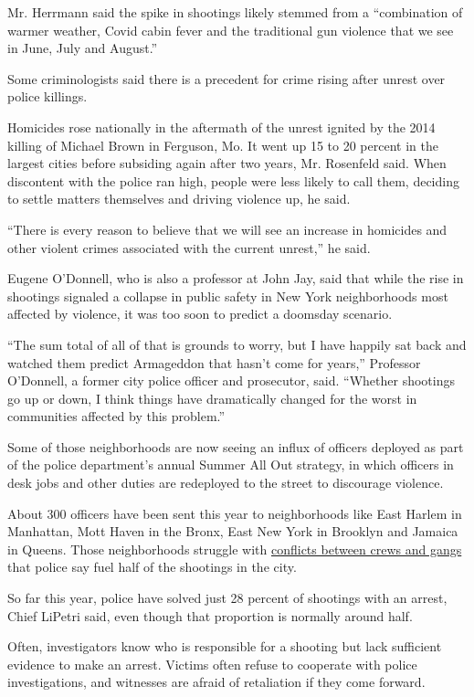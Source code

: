 Mr. Herrmann said the spike in shootings likely stemmed from a
``combination of warmer weather, Covid cabin fever and the traditional
gun violence that we see in June, July and August.''

Some criminologists said there is a precedent for crime rising after
unrest over police killings.

Homicides rose nationally in the aftermath of the unrest ignited by the
2014 killing of Michael Brown in Ferguson, Mo. It went up 15 to 20
percent in the largest cities before subsiding again after two years,
Mr. Rosenfeld said. When discontent with the police ran high, people
were less likely to call them, deciding to settle matters themselves and
driving violence up, he said.

``There is every reason to believe that we will see an increase in
homicides and other violent crimes associated with the current unrest,''
he said.

Eugene O'Donnell, who is also a professor at John Jay, said that while
the rise in shootings signaled a collapse in public safety in New York
neighborhoods most affected by violence, it was too soon to predict a
doomsday scenario.

``The sum total of all of that is grounds to worry, but I have happily
sat back and watched them predict Armageddon that hasn't come for
years,'' Professor O'Donnell, a former city police officer and
prosecutor, said. ``Whether shootings go up or down, I think things have
dramatically changed for the worst in communities affected by this
problem.''

Some of those neighborhoods are now seeing an influx of officers
deployed as part of the police department's annual Summer All Out
strategy, in which officers in desk jobs and other duties are redeployed
to the street to discourage violence.

About 300 officers have been sent this year to neighborhoods like East
Harlem in Manhattan, Mott Haven in the Bronx, East New York in Brooklyn
and Jamaica in Queens. Those neighborhoods struggle with
\href{https://www.nytimes3xbfgragh.onion/2019/12/05/nyregion/queens-gang-shooting-aamir-griffin.html}{conflicts
between crews and gangs} that police say fuel half of the shootings in
the city.

So far this year, police have solved just 28 percent of shootings with
an arrest, Chief LiPetri said, even though that proportion is normally
around half.

Often, investigators know who is responsible for a shooting but lack
sufficient evidence to make an arrest. Victims often refuse to cooperate
with police investigations, and witnesses are afraid of retaliation if
they come forward.

